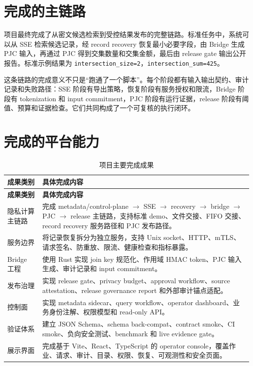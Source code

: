 \documentclass[UTF8,a4paper,12pt,oneside]{ctexrep}
\newcommand{\pipeline}{metadata/control-plane $\rightarrow$ SSE $\rightarrow$ recovery $\rightarrow$ bridge $\rightarrow$ PJC $\rightarrow$ release}
\begin{document}
\section{完成的主链路}

项目最终完成了从密文候选检索到受控结果发布的完整链路。标准任务中，系统可以从 SSE 检索候选记录，经 record recovery 恢复最小必要字段，由 Bridge 生成 PJC 输入，再通过 PJC 得到交集数量和交集金额，最后由 release gate 输出公开报告。标准示例结果为 \texttt{intersection\_size=2}，\texttt{intersection\_sum=425}。

这条链路的完成意义不只是“跑通了一个脚本”。每个阶段都有输入输出契约、审计记录和失败路径：SSE 阶段有导出策略，恢复阶段有服务授权和限流，Bridge 阶段有 tokenization 和 input commitment，PJC 阶段有运行证据，release 阶段有阈值、预算和证据检查。它们共同构成了一个可复核的执行闭环。

\section{完成的平台能力}

\begin{longtable}{p{}p{}}
\caption{项目主要完成成果}\\
\toprule
\textbf{成果类别} & \textbf{具体完成内容} \\
\midrule
\endfirsthead
\toprule
\textbf{成果类别} & \textbf{具体完成内容} \\
\midrule
\endhead
\bottomrule
\endfoot
隐私计算主链路 & 完成 \pipeline{} 主链路，支持标准 demo、文件交接、FIFO 交接、record recovery 服务路径和 PJC 发布路径。 \\
服务边界 & 将记录恢复拆分为独立服务，支持 Unix socket、HTTP、mTLS、请求签名、防重放、限流、健康检查和指标暴露。 \\
Bridge 工程 & 使用 Rust 实现 join key 规范化、作用域 HMAC token、PJC 输入生成、审计记录和 input commitment。 \\
发布治理 & 实现 release gate、privacy budget、approval workflow、source attestation、release governance report 和外部审计锚点适配。 \\
控制面 & 实现 metadata sidecar、query workflow、operator dashboard、业务身份注解、权限模型和 read-only API。 \\
验证体系 & 建立 JSON Schema、schema back-compat、contract smoke、CI smoke、负向安全测试、benchmark 和 live evidence gate。 \\
展示界面 & 完成基于 Vite、React、TypeScript 的 operator console，覆盖作业、请求、审计、目录、权限、恢复、可观测性和安全页面。 \\
\end{longtable}
\end{document}
